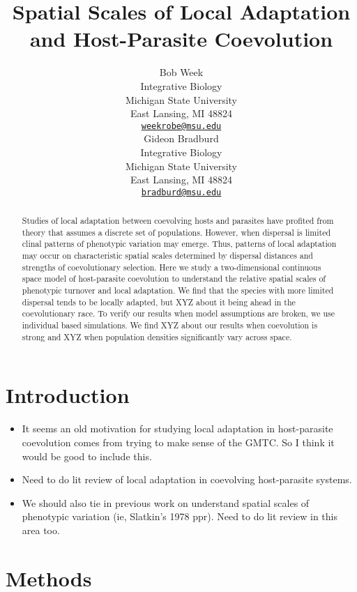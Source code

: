 \documentclass{article}
\title{Spatial Scales of Local Adaptation and Host-Parasite Coevolution}
\author{
    Bob Week
   \\
    Integrative Biology \\
    Michigan State University \\
  East Lansing, MI 48824 \\
  \texttt{\href{mailto:weekrobe@msu.edu}{\nolinkurl{weekrobe@msu.edu}}} \\
   \And
    Gideon Bradburd
   \\
    Integrative Biology \\
    Michigan State University \\
  East Lansing, MI 48824 \\
  \texttt{\href{mailto:bradburd@msu.edu}{\nolinkurl{bradburd@msu.edu}}} \\
  }
\begin{document}
\maketitle

\def\tightlist{}


\begin{abstract}
Studies of local adaptation between coevolving hosts and parasites have
profited from theory that assumes a discrete set of populations.
However, when dispersal is limited clinal patterns of phenotypic
variation may emerge. Thus, patterns of local adaptation may occur on
characteristic spatial scales determined by dispersal distances and
strengths of coevolutionary selection. Here we study a two-dimensional
continuous space model of host-parasite coevolution to understand the
relative spatial scales of phenotypic turnover and local adaptation. We
find that the species with more limited dispersal tends to be locally
adapted, but XYZ about it being ahead in the coevolutionary race. To
verify our results when model assumptions are broken, we use individual
based simulations. We find XYZ about our results when coevolution is
strong and XYZ when population densities significantly vary across
space.
\end{abstract}


\newpage

\hypertarget{introduction}{%
\section{Introduction}\label{introduction}}

\begin{itemize}
\item
  It seems an old motivation for studying local adaptation in
  host-parasite coevolution comes from trying to make sense of the GMTC.
  So I think it would be good to include this.
\item
  Need to do lit review of local adaptation in coevolving host-parasite
  systems.
\item
  We should also tie in previous work on understand spatial scales of
  phenotypic variation (ie, Slatkin's 1978 ppr). Need to do lit review
  in this area too.
\end{itemize}

\hypertarget{methods}{%
\section{Methods}\label{methods}}
\end{document}

